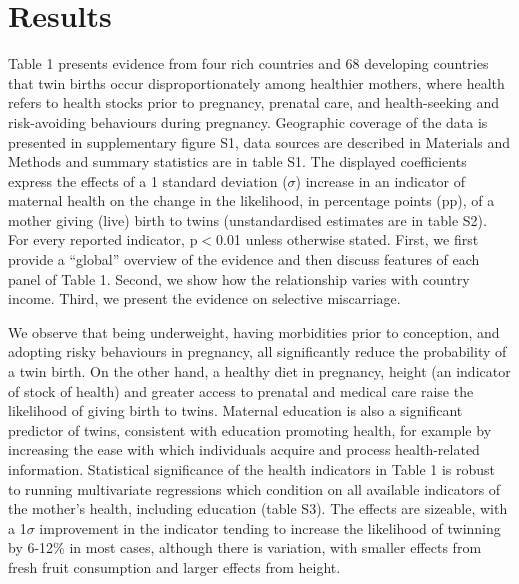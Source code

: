 \documentclass[11pt]{article}
\begin{document}


\section*{Results}
Table 1 presents evidence from four rich countries and 68 developing countries that twin births occur disproportionately among healthier mothers, where health refers to health stocks prior to pregnancy, prenatal care, and health-seeking and risk-avoiding behaviours during pregnancy. Geographic coverage of the data is presented in supplementary figure S1, data sources are described in Materials and Methods and summary statistics are in table S1. The displayed coefficients express the effects of a 1 standard deviation ($\sigma$) increase in an indicator of maternal health on the change in the likelihood, in percentage points (pp), of a mother giving (live) birth to twins (unstandardised estimates are in table S2). For every reported indicator, p$<$0.01 unless otherwise stated. First, we first provide a ``global'' overview of the evidence and then discuss features of each panel of Table 1. Second, we show how the relationship varies with country income. Third, we present the evidence on selective miscarriage.

We observe that being underweight, having morbidities prior to conception, and adopting risky behaviours in pregnancy, all significantly reduce the probability of a twin birth. On the other hand, a healthy diet in pregnancy, height (an indicator of stock of health\cite{Silventoinen2003,BhalotraRawlings2013}) and greater access to prenatal and medical care raise the likelihood of giving birth to twins. Maternal education is also a significant predictor of twins, consistent with education promoting health, for example by increasing the ease with which individuals acquire and process health-related information\cite{Kenkel1991,CutlerLlerasMuney2010}. Statistical significance of the health indicators in Table 1 is robust to running multivariate regressions which condition on all available indicators of the mother's health, including education (table S3). The effects are sizeable, with a 1$\sigma$ improvement in the indicator tending to increase the likelihood of twinning by 6-12\% in most cases, although there is variation, with smaller effects from fresh fruit consumption and larger effects from height.
\end{document}
